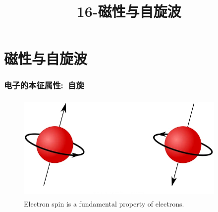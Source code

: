 \title{16-磁性与自旋波}
\section{磁性与自旋波}
\frame
{
	\frametitle{电子的本征属性:~自旋}
\begin{figure}[h!]
\vspace*{-0.08in}
\centering
\includegraphics[height=2.05in,width=4.00in,viewport=0 0 580 290,clip]{Figures/electron-spin_2.jpeg}
\caption{\tiny \textrm{Electron spin is a fundamental property of electrons.}}%
\label{Fig:Electron-spin}
\end{figure}
}

